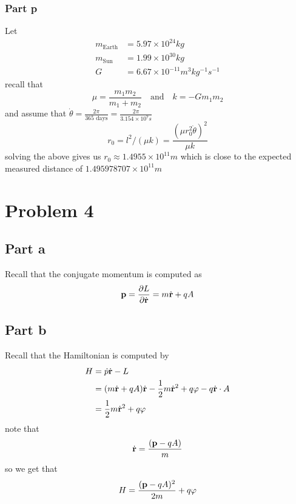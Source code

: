 \documentclass[12pt]{report}
\newcommand{\rb}{\bold{r}}
\begin{document}
\subsubsection*{Part p}
Let 
\begin{align*}
    m_{\text{Earth}} &= 5.97 \times 10^{24} \si{kg} \\
    m_{\text{Sun}} &= 1.99 \times 10^{30} \si{kg} \\
    G &= 6.67 \times 10^{-11} \si{m^3 kg^{-1} s^{-1}}
\end{align*}
recall that
\begin{equation*}
    \mu = \frac{m_1m_2}{m_1 + m_2} \quad \text{and} \quad k = -Gm_1m_2
\end{equation*}
and assume that $\dot{\theta} = \frac{2\pi}{365 \text{ days}} = \frac{2\pi}{3.154 \times 10^7s}$
\begin{equation*}
    r_0 = l^2/(\mu k) = \frac{(\mu r_0^2 \dot{\theta})^2}{\mu k}
\end{equation*}
solving the above gives us $r_0 \approx 1.4955 \times 10^{11}\si{m} $ which is close to the expected measured distance of $1.495978707 \times 10^{11} \si{m}$
\section*{Problem 4}
\subsection*{Part a}
Recall that the conjugate momentum is computed as
\begin{equation*}
    \bold{p} = \frac{\partial L}{\partial \dot{\rb}} = m \dot{\rb} + qA
\end{equation*}

\subsection*{Part b}
Recall that the Hamiltonian is computed by
\begin{align*}
    H &= \dot{p}\dot{\rb} - L \\
      &= (m\dot{\rb}+ qA) \dot{\rb}  - \frac{1}{2}m \dot{\rb}^2 + q\varphi - q\dot{\rb} \cdot A \\
      &= \frac{1}{2} m\dot{\rb}^2 + q\varphi \\
\end{align*}
note that
\begin{equation*}
    \dot{\rb} = \frac{(\bold{p}-qA)}{m}
\end{equation*}
so we get that
\begin{equation*}
    H = \frac{(\bold{p} - qA)^2}{2m} + q\varphi
\end{equation*}
\end{document}
